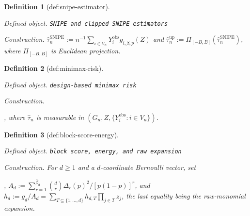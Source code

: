 \documentclass{article}
\newtheorem{definition}{Definition}
\begin{document}
\begin{definition}[def:snipe-estimator]\label{def:snipe-estimator}
\par\smallskip\noindent\emph{Defined object.} \texttt{SNIPE and clipped SNIPE estimators}
\par\smallskip\noindent\emph{Construction.} \(\widehat\tau_n^{\mathrm{SNIPE}}:=n^{-1}\sum_{i\in V_n}Y_i^{\mathrm{obs}}g_{i,\beta,p}(Z)\) and \(\widehat\tau_n^{\mathrm{up}}:=\Pi_{[-B,B]}(\widehat\tau_n^{\mathrm{SNIPE}})\), where \(\Pi_{[-B,B]}\) is Euclidean projection.
\end{definition}

\begin{definition}[def:minimax-risk]\label{def:minimax-risk}
\par\smallskip\noindent\emph{Defined object.} \texttt{design-\allowbreak{}based minimax risk}
\par\smallskip\noindent\emph{Construction.} \par\noindent {}\par\noindent, where \(\widehat\tau_n\) is measurable in \((G_n,Z,\{Y_i^{\mathrm{obs}}:i\in V_n\})\).
\end{definition}

\begin{definition}[def:block-score-energy]\label{def:block-score-energy}
\par\smallskip\noindent\emph{Defined object.} \texttt{block score,\allowbreak{} energy,\allowbreak{} and raw expansion}
\par\smallskip\noindent\emph{Construction.} For \(d\ge1\) and a \(d\)-coordinate Bernoulli vector, set \par\noindent {}\par\noindent, \(A_d:=\sum_{r=1}^{\bar\beta_d}\binom{d}{r}\Delta_r(p)^2/[p(1-p)]^r\), and \(h_d:=g_d/A_d=\sum_{T\subseteq\{1,\ldots,d\}}h_{d,T}\prod_{j\in T}z_j\), the last equality being the raw-monomial expansion.
\end{definition}
\end{document}
